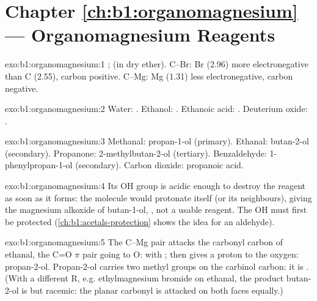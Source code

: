 \section*{Chapter \ref{ch:b1:organomagnesium} --- Organomagnesium Reagents}

\begin{solution}{exo:b1:organomagnesium:1}
;  (in dry
ether). C--Br: Br (2.96) more electronegative than C (2.55), carbon
positive. C--Mg: Mg (1.31) less electronegative, carbon negative.
\end{solution}

\begin{solution}{exo:b1:organomagnesium:2}
Water: .
Ethanol: .
Ethanoic acid: .
Deuterium oxide: .
\end{solution}

\begin{solution}{exo:b1:organomagnesium:3}
Methanal: propan-1-ol (primary). Ethanal: butan-2-ol (secondary).
Propanone: 2-methylbutan-2-ol (tertiary). Benzaldehyde:
1-phenylpropan-1-ol (secondary). Carbon dioxide: propanoic acid.
\end{solution}

\begin{solution}{exo:b1:organomagnesium:4}
Its OH group is acidic enough to destroy the reagent as soon as it forms:
the molecule would protonate itself (or its neighbours), giving the
magnesium alkoxide of butan-1-ol, , not a usable
reagent. The OH must first be protected
(\cref{ch:b1:acetals-protection} shows the idea for an aldehyde).
\end{solution}

\begin{solution}{exo:b1:organomagnesium:5}
The C--Mg pair attacks the carbonyl carbon of ethanal, the C=O $\pi$ pair
going to O:  with ; then  gives a
proton to the oxygen: propan-2-ol. Propan-2-ol carries two methyl groups
on the carbinol carbon: it is . (With a different R, e.g.
ethylmagnesium bromide on ethanal, the product butan-2-ol is  but
racemic: the planar carbonyl is attacked on both faces equally.)
\end{solution}

